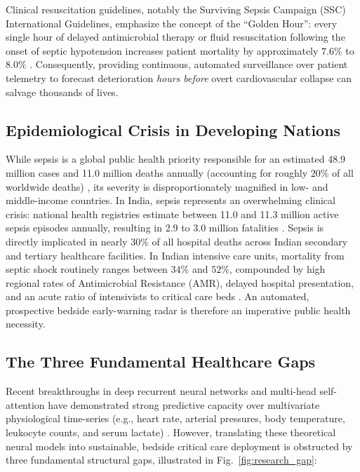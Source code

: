 \documentclass[final,5p,times,twocolumn]{elsarticle}
\begin{document}
Clinical resuscitation guidelines, notably the Surviving Sepsis Campaign (SSC) International Guidelines, emphasize the concept of the ``Golden Hour'': every single hour of delayed antimicrobial therapy or fluid resuscitation following the onset of septic hypotension increases patient mortality by approximately $7.6\%$ to $8.0\%$ \cite{evans2021surviving}. Consequently, providing continuous, automated surveillance over patient telemetry to forecast deterioration \textit{hours before} overt cardiovascular collapse can salvage thousands of lives.

\subsection{Epidemiological Crisis in Developing Nations}
While sepsis is a global public health priority responsible for an estimated 48.9 million cases and 11.0 million deaths annually (accounting for roughly $20\%$ of all worldwide deaths) \cite{rudd2020global}, its severity is disproportionately magnified in low- and middle-income countries. In India, sepsis represents an overwhelming clinical crisis: national health registries estimate between 11.0 and 11.3 million active sepsis episodes annually, resulting in 2.9 to 3.0 million fatalities \cite{chatterjee2020india,kalakoti2025fedxai}. Sepsis is directly implicated in nearly $30\%$ of all hospital deaths across Indian secondary and tertiary healthcare facilities. In Indian intensive care units, mortality from septic shock routinely ranges between $34\%$ and $52\%$, compounded by high regional rates of Antimicrobial Resistance (AMR), delayed hospital presentation, and an acute ratio of intensivists to critical care beds \cite{chatterjee2020india}. An automated, prospective bedside early-warning radar is therefore an imperative public health necessity.

\subsection{The Three Fundamental Healthcare Gaps}
Recent breakthroughs in deep recurrent neural networks and multi-head self-attention have demonstrated strong predictive capacity over multivariate physiological time-series (e.g., heart rate, arterial pressures, body temperature, leukocyte counts, and serum lactate) \cite{shashikumar2021deepai,futoma2017learning,desautels2016prediction}. However, translating these theoretical neural models into sustainable, bedside critical care deployment is obstructed by three fundamental structural gaps, illustrated in Fig.~\ref{fig:research_gap}:
\end{document}
